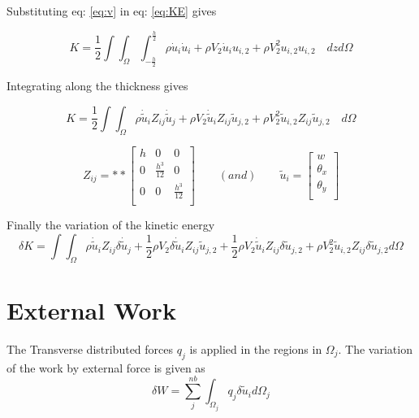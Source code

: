 \documentclass[main.tex]{subfiles}
\begin{document}
Substituting eq: \ref{eq:v} in eq: \ref{eq:KE} gives

\begin{equation}
K=\frac{1}{2} 
\int \int_\Omega \int_{-\frac{h}{2}}^{\frac{h}{2}} 
\rho  \dot{u}_i    \dot{u}_i
+
\rho  V_2 \dot{u}_i   u_{i,2}
+
\rho  V_2^2  u_{i,2}   u_{i,2}
\quad
 dz 
 d\Omega
\end{equation}

Integrating along the thickness gives


\begin{equation}
K=\frac{1}{2} 
\int \int_\Omega
\rho  \dot{\tilde{u}}_i  Z_{ij}    \dot{\tilde{u}}_j
+
\rho  V_2 \dot{\tilde{u}}_i  Z_{ij}  \tilde{u}_{j,2}
+
\rho  V_2^2 \tilde{u}_{i,2}  Z_{ij}  \tilde{u}_{j,2}
\quad
 d\Omega
\end{equation}

\begin{equation}
 Z_{ij}  = **
 \begin{bmatrix}
h   &  0 & 0 \\
0   &  \frac{h^3}{12}& 0 \\
0   &  0 & \frac{h^3}{12} \\
\end{bmatrix}
\qquad
(and)
\qquad
 \tilde{u}_i  = 
 \begin{bmatrix}
w   \\
\theta_x    \\
\theta_y   \\
\end{bmatrix}
\end{equation}

Finally the variation of the kinetic energy
\begin{equation}\label{eq:vr_KE}
\delta K=
\int \int_\Omega
\rho  \dot{\tilde{u}}_i  Z_{ij}   \delta \dot{\tilde{u}}_j
+ \frac{1}{2} 
\rho  V_2 \delta \dot{\tilde{u}}_i  Z_{ij}  \tilde{u}_{j,2}
+ \frac{1}{2} 
\rho  V_2 \dot{\tilde{u}}_i  Z_{ij} \delta \tilde{u}_{j,2}
+
\rho  V_2^2  \tilde{u}_{i,2}  Z_{ij} \delta \tilde{u}_{j,2}
 d\Omega
\end{equation}



\section{External Work}
The Transverse distributed forces $q_j$ is applied in the regions in $\Omega_j$. The variation of the work by external force is given as
\begin{equation}\label{eq:vr_W}
\delta W=\sum_j^{nb} \int_{\Omega_j} q_j \delta \tilde{u}_i  d \Omega_j
\end{equation}
\end{document}
